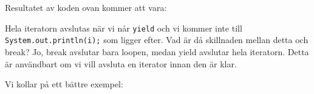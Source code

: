 Resultatet av koden ovan kommer att vara:

\begin{Shaded}
\begin{Highlighting}[]
\end{Highlighting}
\end{Shaded}

Hela iteratorn avslutas när vi når \texttt{yield} och vi kommer inte
till \texttt{System.out.println(i);} som ligger efter. Vad är då
skillnaden mellan detta och break? Jo, break avslutar bara loopen, medan
yield avslutar hela iteratorn. Detta är användbart om vi vill avsluta en
iterator innan den är klar.

Vi kollar på ett bättre exempel:

\hypertarget{cb9}{}
\begin{Shaded}
\begin{Highlighting}[]

   \OperatorTok{(}\OperatorTok{[]}\OperatorTok{)} \OperatorTok{\{}
    \OperatorTok{(}\OperatorTok{);}
    \OperatorTok{(}\OperatorTok{());}
    \OperatorTok{(}\OperatorTok{());}
    \OperatorTok{(}\OperatorTok{());}
    \OperatorTok{(}\OperatorTok{());}
    \OperatorTok{(}\OperatorTok{);}
\OperatorTok{\}}

   \OperatorTok{()} \OperatorTok{\{}
    \OperatorTok{(}\OperatorTok{=} \OperatorTok{;}\OperatorTok{\textless{}} \OperatorTok{;}\OperatorTok{++)} \OperatorTok{\{}
        \OperatorTok{(}\OperatorTok{\textgreater{}=} \OperatorTok{)} \OperatorTok{\{}
\OperatorTok{;}
        \OperatorTok{\}}
        \OperatorTok{(}\OperatorTok{);}
    \OperatorTok{\}}
     \OperatorTok{;}
\OperatorTok{\}}
\end{Highlighting}
\end{Shaded}

